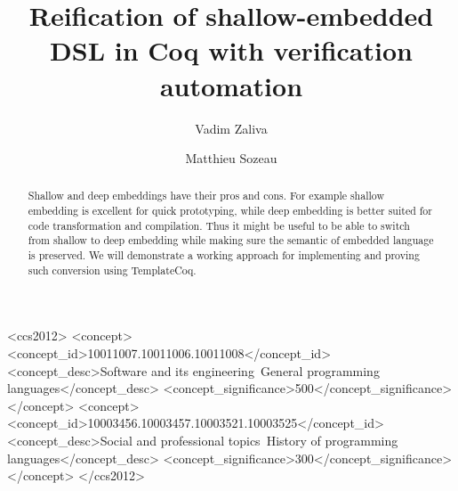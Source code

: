 \documentclass[sigplan]{acmart}\settopmatter{printfolios=true,printccs=false,printacmref=false}
\begin{document}
\title{Reification of shallow-embedded DSL in Coq with verification automation}         %


\author{Vadim Zaliva}

\author{Matthieu Sozeau}


\begin{abstract}
  Shallow and deep embeddings have their pros and cons.  For example
  shallow embedding is excellent for quick prototyping, while deep
  embedding is better suited for code transformation and compilation.
  Thus it might be useful to be able to switch from shallow to deep
  embedding while making sure the semantic of embedded language is
  preserved. We will demonstrate a working approach for implementing
  and proving such conversion using TemplateCoq.
\end{abstract}


\begin{CCSXML}
<ccs2012>
<concept>
<concept_id>10011007.10011006.10011008</concept_id>
<concept_desc>Software and its engineering~General programming languages</concept_desc>
<concept_significance>500</concept_significance>
</concept>
<concept>
<concept_id>10003456.10003457.10003521.10003525</concept_id>
<concept_desc>Social and professional topics~History of programming languages</concept_desc>
<concept_significance>300</concept_significance>
</concept>
</ccs2012>
\end{CCSXML}

\end{document}
